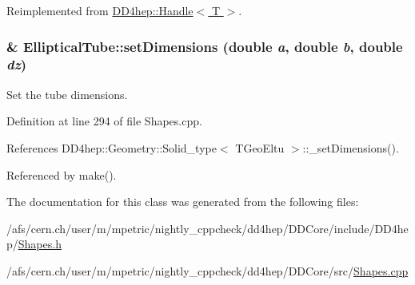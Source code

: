 Reimplemented from \hyperlink{class_d_d4hep_1_1_handle_a9bbf8f498df42e81ad26fb00233505a6}{DD4hep::Handle$<$ T $>$}.\hypertarget{class_d_d4hep_1_1_geometry_1_1_elliptical_tube_a65ee98dd3ac38b6158fa55443919c0f5}{
\subsubsection[{setDimensions}]{ \& EllipticalTube::setDimensions (double {\em a}, \/  double {\em b}, \/  double {\em dz})}}
\label{class_d_d4hep_1_1_geometry_1_1_elliptical_tube_a65ee98dd3ac38b6158fa55443919c0f5}


Set the tube dimensions. 

Definition at line 294 of file Shapes.cpp.

References DD4hep::Geometry::Solid\_\-type$<$ TGeoEltu $>$::\_\-setDimensions().

Referenced by make().

The documentation for this class was generated from the following files:\begin{DoxyCompactItemize}
\item 
/afs/cern.ch/user/m/mpetric/nightly\_\-cppcheck/dd4hep/DDCore/include/DD4hep/\hyperlink{_shapes_8h}{Shapes.h}\item 
/afs/cern.ch/user/m/mpetric/nightly\_\-cppcheck/dd4hep/DDCore/src/\hyperlink{_shapes_8cpp}{Shapes.cpp}\end{DoxyCompactItemize}
